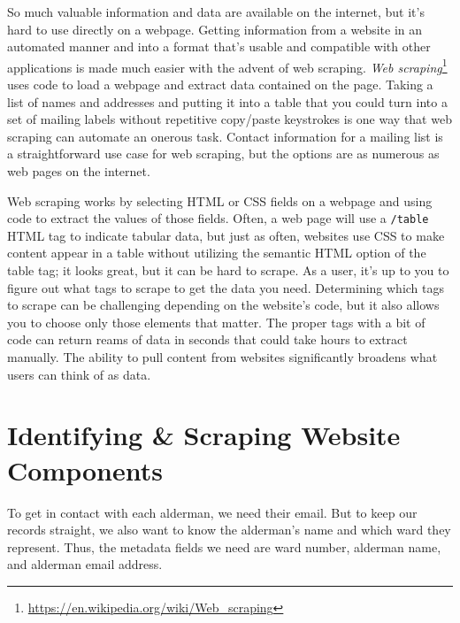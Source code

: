\documentclass[
  krantz2]{krantz}
\begin{document}
So much valuable information and data are available on the internet, but it's hard to use directly on a webpage. Getting information from a website in an automated manner and into a format that's usable and compatible with other applications is made much easier with the advent of web scraping. \emph{Web scraping}\footnote{\url{https://en.wikipedia.org/wiki/Web_scraping}} uses code to load a webpage and extract data contained on the page. Taking a list of names and addresses and putting it into a table that you could turn into a set of mailing labels without repetitive copy/paste keystrokes is one way that web scraping can automate an onerous task. Contact information for a mailing list is a straightforward use case for web scraping, but the options are as numerous as web pages on the internet.

Web scraping works by selecting HTML or CSS fields on a webpage and using code to extract the values of those fields. Often, a web page will use a \texttt{/table} HTML tag to indicate tabular data, but just as often, websites use CSS to make content appear in a table without utilizing the semantic HTML option of the table tag; it looks great, but it can be hard to scrape. As a user, it's up to you to figure out what tags to scrape to get the data you need. Determining which tags to scrape can be challenging depending on the website's code, but it also allows you to choose only those elements that matter. The proper tags with a bit of code can return reams of data in seconds that could take hours to extract manually. The ability to pull content from websites significantly broadens what users can think of as data.

\hypertarget{rvest-components}{%
\section{Identifying \& Scraping Website Components}\label{rvest-components}}

To get in contact with each alderman, we need their email. But to keep our records straight, we also want to know the alderman's name and which ward they represent. Thus, the metadata fields we need are ward number, alderman name, and alderman email address.
\end{document}
